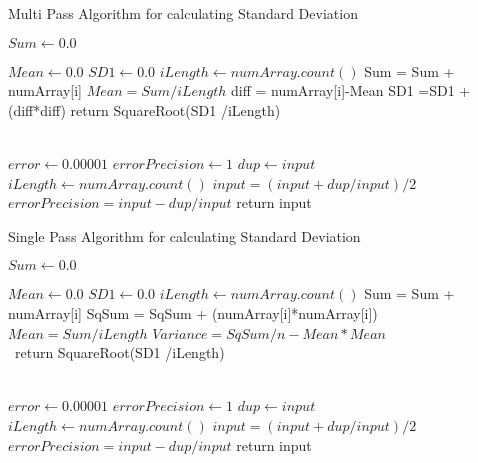 \documentclass[11pt]{report}
\begin{document}
\begin{algorithm}
\caption{Multi Pass Algorithm for calculating Standard Deviation}

\small
\begin{algorithmic}

\State $Sum \gets 0.0$

\State $Mean \gets 0.0$
\State $SD1 \gets 0.0$
\State $iLength \gets numArray.count()$
    \State Sum = Sum + numArray[i]
\EndFor    
\State $Mean= Sum/iLength$    
    \State diff = numArray[i]-Mean
    \State SD1 =SD1 + (diff*diff)
\EndFor
return SquareRoot(SD1 /iLength)
\EndFunction


\\
\State $error \gets 0.00001$
\State $errorPrecision \gets 1$
\State $dup \gets input$
\State $iLength \gets numArray.count()$
   \State $input = (input+dup/input)/2$
   \State $errorPrecision = input-dup/input$
\EndWhile
return input
\EndFunction
\\

\end{algorithmic}
\end{algorithm}
\pagebreak
\begin{algorithm}
\caption{Single Pass Algorithm for calculating Standard Deviation}


\begin{algorithmic}

\State $Sum \gets 0.0$

\State $Mean \gets 0.0$
\State $SD1 \gets 0.0$
\State $iLength \gets numArray.count()$
    \State Sum = Sum + numArray[i]
    \State SqSum = SqSum + (numArray[i]*numArray[i])
\EndFor    
\State $Mean= Sum/iLength$    
\State $Variance = SqSum/n - Mean*Mean$
\\
\quad\, return SquareRoot(SD1 /iLength)
\EndFunction


\\
\State $error \gets 0.00001$
\State $errorPrecision \gets 1$
\State $dup \gets input$
\State $iLength \gets numArray.count()$
   \State $input = (input+dup/input)/2$
   \State $errorPrecision = input-dup/input$
\EndWhile
return input
\EndFunction
\\

\end{algorithmic}
\end{algorithm}
\end{document}

